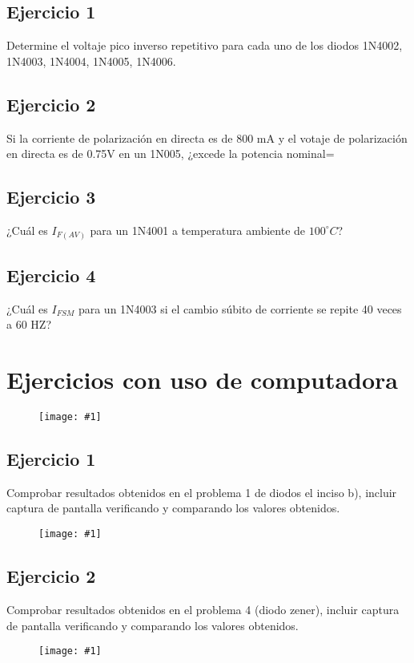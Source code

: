 \documentclass{mylib/reporteCorto}
\newcommand{\insertImage}[2]{
	\begin{figure}[H]
		\centering
		\texttt{[image: \#1]}
	\end{figure}
}
\begin{document}
\subsection{Ejercicio 1}

Determine el voltaje pico inverso repetitivo para cada uno de los diodos 1N4002, 1N4003, 1N4004, 1N4005,  1N4006. 

\subsection{Ejercicio 2}

Si la corriente de polarización en directa es de 800 mA y el votaje de polarización en directa es de 0.75V en un 1N005, ¿excede la potencia nominal=

\subsection{Ejercicio 3}

¿Cuál es $I_{F(AV)}$ para un 1N4001  a temperatura ambiente de $100 ^\circ C$?

\subsection{Ejercicio 4}

¿Cuál es $I_{FSM}$ para un 1N4003 si el cambio súbito de corriente se repite 40 veces a 60 HZ?

\section{Ejercicios con uso de computadora}

\insertImage{img/dispos_serie2/sol_eje_fabricante}{10}


\subsection{Ejercicio 1}

Comprobar resultados obtenidos en el problema 1 de diodos el inciso b), incluir captura de pantalla verificando
y comparando los valores obtenidos.

\insertImage{img/dispos_serie2/dol_comp1}{10}


\subsection{Ejercicio 2}

Comprobar resultados obtenidos en el problema 4 (diodo zener), incluir captura de pantalla verificando y
comparando los valores obtenidos.

\insertImage{img/dispos_serie2/dol_comp2}{10}
\end{document}
